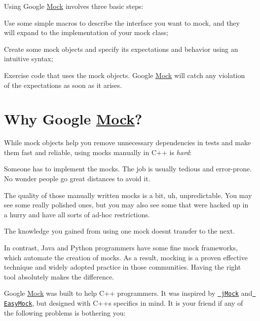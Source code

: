 Using Google \mbox{\hyperlink{class_mock}{Mock}} involves three basic steps\+:


\begin{DoxyEnumerate}
\item Use some simple macros to describe the interface you want to mock, and they will expand to the implementation of your mock class;
\end{DoxyEnumerate}
\begin{DoxyEnumerate}
\item Create some mock objects and specify its expectations and behavior using an intuitive syntax;
\end{DoxyEnumerate}
\begin{DoxyEnumerate}
\item Exercise code that uses the mock objects. Google \mbox{\hyperlink{class_mock}{Mock}} will catch any violation of the expectations as soon as it arises.
\end{DoxyEnumerate}

\section*{Why Google \mbox{\hyperlink{class_mock}{Mock}}?}

While mock objects help you remove unnecessary dependencies in tests and make them fast and reliable, using mocks manually in C++ is {\itshape hard}\+:


\begin{DoxyItemize}
\item Someone has to implement the mocks. The job is usually tedious and error-\/prone. No wonder people go great distances to avoid it.
\item The quality of those manually written mocks is a bit, uh, unpredictable. You may see some really polished ones, but you may also see some that were hacked up in a hurry and have all sorts of ad-\/hoc restrictions.
\item The knowledge you gained from using one mock doesn\textquotesingle{}t transfer to the next.
\end{DoxyItemize}

In contrast, Java and Python programmers have some fine mock frameworks, which automate the creation of mocks. As a result, mocking is a proven effective technique and widely adopted practice in those communities. Having the right tool absolutely makes the difference.

Google \mbox{\hyperlink{class_mock}{Mock}} was built to help C++ programmers. It was inspired by \href{http://www.jmock.org/}{\texttt{ j\+Mock}} and \href{http://www.easymock.org/}{\texttt{ Easy\+Mock}}, but designed with C++\textquotesingle{}s specifics in mind. It is your friend if any of the following problems is bothering you\+:


